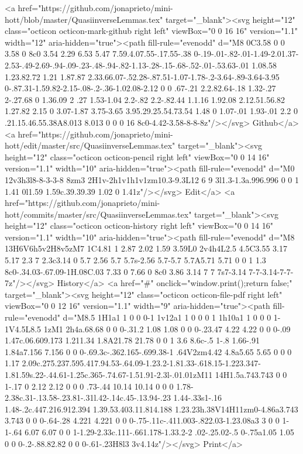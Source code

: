       <a href="https://github.com/jonaprieto/mini-hott/blob/master/QuasiinverseLemmas.tex" target="_blank"><svg height="12" class="octicon octicon-mark-github right left" viewBox="0 0 16 16" version="1.1" width="12" aria-hidden="true"><path fill-rule="evenodd" d="M8 0C3.58 0 0 3.58 0 8c0 3.54 2.29 6.53 5.47 7.59.4.07.55-.17.55-.38 0-.19-.01-.82-.01-1.49-2.01.37-2.53-.49-2.69-.94-.09-.23-.48-.94-.82-1.13-.28-.15-.68-.52-.01-.53.63-.01 1.08.58 1.23.82.72 1.21 1.87.87 2.33.66.07-.52.28-.87.51-1.07-1.78-.2-3.64-.89-3.64-3.95 0-.87.31-1.59.82-2.15-.08-.2-.36-1.02.08-2.12 0 0 .67-.21 2.2.82.64-.18 1.32-.27 2-.27.68 0 1.36.09 2 .27 1.53-1.04 2.2-.82 2.2-.82.44 1.1.16 1.92.08 2.12.51.56.82 1.27.82 2.15 0 3.07-1.87 3.75-3.65 3.95.29.25.54.73.54 1.48 0 1.07-.01 1.93-.01 2.2 0 .21.15.46.55.38A8.013 8.013 0 0 0 16 8c0-4.42-3.58-8-8-8z"/></svg> Github</a>
      <a href="https://github.com/jonaprieto/mini-hott/edit/master/src/QuasiinverseLemmas.tex" target="_blank"><svg height="12" class="octicon octicon-pencil right left" viewBox="0 0 14 16" version="1.1" width="10" aria-hidden="true"><path fill-rule="evenodd" d="M0 12v3h3l8-8-3-3-8 8zm3 2H1v-2h1v1h1v1zm10.3-9.3L12 6 9 3l1.3-1.3a.996.996 0 0 1 1.41 0l1.59 1.59c.39.39.39 1.02 0 1.41z"/></svg> Edit</a>
      <a href="https://github.com/jonaprieto/mini-hott/commits/master/src/QuasiinverseLemmas.tex" target="_blank"><svg height="12" class="octicon octicon-history right left" viewBox="0 0 14 16" version="1.1" width="10" aria-hidden="true"><path fill-rule="evenodd" d="M8 13H6V6h5v2H8v5zM7 1C4.81 1 2.87 2.02 1.59 3.59L0 2v4h4L2.5 4.5C3.55 3.17 5.17 2.3 7 2.3c3.14 0 5.7 2.56 5.7 5.7s-2.56 5.7-5.7 5.7A5.71 5.71 0 0 1 1.3 8c0-.34.03-.67.09-1H.08C.03 7.33 0 7.66 0 8c0 3.86 3.14 7 7 7s7-3.14 7-7-3.14-7-7-7z"/></svg> History</a>
      <a  href="#" onclick="window.print();return false;" target="_blank"><svg height="12" class="octicon octicon-file-pdf right left" viewBox="0 0 12 16" version="1.1" width="9" aria-hidden="true"><path fill-rule="evenodd" d="M8.5 1H1a1 1 0 0 0-1 1v12a1 1 0 0 0 1 1h10a1 1 0 0 0 1-1V4.5L8.5 1zM1 2h4a.68.68 0 0 0-.31.2 1.08 1.08 0 0 0-.23.47 4.22 4.22 0 0 0-.09 1.47c.06.609.173 1.211.34 1.8A21.78 21.78 0 0 1 3.6 8.6c-.5 1-.8 1.66-.91 1.84a7.156 7.156 0 0 0-.69.3c-.362.165-.699.38-1 .64V2zm4.42 4.8a5.65 5.65 0 0 0 1.17 2.09c.275.237.595.417.94.53-.64.09-1.23.2-1.81.33-.618.15-1.223.347-1.81.59s.22-.44.61-1.25c.365-.74.67-1.51.91-2.3l-.01.01zM11 14H1.5a.743.743 0 0 1-.17 0 2.12 2.12 0 0 0 .73-.44 10.14 10.14 0 0 0 1.78-2.38c.31-.13.58-.23.81-.31l.42-.14c.45-.13.94-.23 1.44-.33s1-.16 1.48-.2c.447.216.912.394 1.39.53.403.11.814.188 1.23.23h.38V14H11zm0-4.86a3.743 3.743 0 0 0-.64-.28 4.221 4.221 0 0 0-.75-.11c-.411.003-.822.03-1.23.08a3 3 0 0 1-1-.64 6.07 6.07 0 0 1-1.29-2.33c.111-.661.178-1.33.2-2 .02-.25.02-.5 0-.75a1.05 1.05 0 0 0-.2-.88.82.82 0 0 0-.61-.23H8l3 3v4.14z"/></svg> Print</a>
